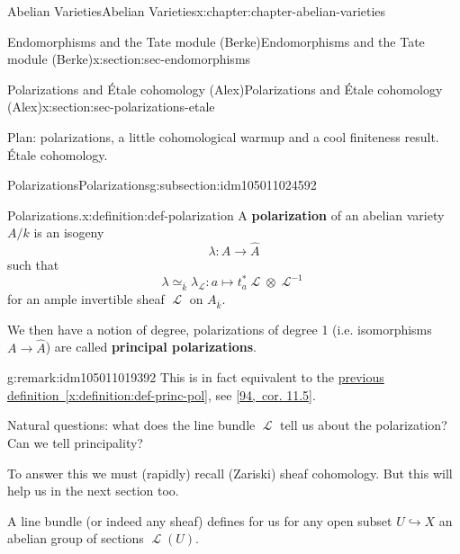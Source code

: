 \documentclass[oneside,10pt,]{book}
\newcommand{\terminology}[1]{\textbf{#1}}
\numberwithin{equation}{section}
\newcommand{\sheaf}[1]{\operatorname{\mathcal{#1}}}
\begin{document}
\begin{chapterptx}{Abelian Varieties}{}{Abelian Varieties}{}{}{x:chapter:chapter-abelian-varieties}
\begin{sectionptx}{Endomorphisms and the Tate module (Berke)}{}{Endomorphisms and the Tate module (Berke)}{}{}{x:section:sec-endomorphisms}
\end{sectionptx}
%
%
\typeout{************************************************}
\typeout{************************************************}
%
\begin{sectionptx}{Polarizations and Étale cohomology (Alex)}{}{Polarizations and Étale cohomology (Alex)}{}{}{x:section:sec-polarizations-etale}
\begin{introduction}{}%
Plan: polarizations, a little cohomological warmup and a cool finiteness result. Étale cohomology.%
\end{introduction}%
%
%
\typeout{************************************************}
\typeout{************************************************}
%
\begin{subsectionptx}{Polarizations}{}{Polarizations}{}{}{g:subsection:idm105011024592}
\begin{definition}{Polarizations.}{x:definition:def-polarization}%
A \terminology{polarization} of an abelian variety \(A/k\) is an isogeny%
\begin{equation*}
\lambda \colon A \to \hat A
\end{equation*}
such that%
\begin{equation*}
\lambda \simeq_{\overline k} \lambda_{\sheaf{L}} : a\mapsto t_a^*\sheaf L \otimes \sheaf L^{-1}
\end{equation*}
for an ample invertible sheaf \(\sheaf L\) on \(A_{\overline k}\).%
\par
We then have a notion of degree, polarizations of degree 1 (i.e. isomorphisms \(A\to \hat A\)) are called \terminology{principal polarizations}.%
\end{definition}
\begin{remark}{}{g:remark:idm105011019392}%
This is in fact equivalent to the \hyperref[x:definition:def-princ-pol]{previous definition~\ref{x:definition:def-princ-pol}}, see \hyperlink{x:biblio:bib-vandergeer-moonen}{[94,~cor. 11.5]}.%
\end{remark}
Natural questions: what does the line bundle \(\sheaf L\) tell us about the polarization? Can we tell principality?%
\par
To answer this we must (rapidly) recall (Zariski) sheaf cohomology. But this will help us in the next section too.%
\par
A line bundle (or indeed any sheaf) defines for us for any open subset \(U \hookrightarrow X\) an abelian group of sections \(\sheaf L(U)\).%

\end{subsectionptx}
\end{sectionptx}
\end{chapterptx}
\end{document}
